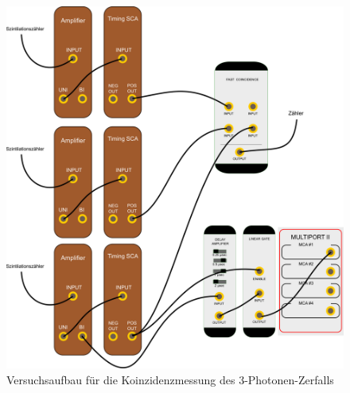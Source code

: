 \begin{figure}
 \includegraphics[width=\textwidth]{BilderAufbau/3er-koinzidenz.pdf}
 \caption{Versuchsaufbau für die Koinzidenzmessung des 3-Photonen-Zerfalls}
\end{figure}
